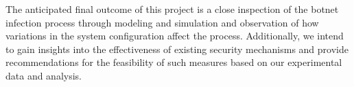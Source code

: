 The anticipated final outcome of this project is a close inspection of the botnet infection process through modeling and simulation and observation of how variations in the system configuration affect the process. Additionally, we intend to gain insights into the effectiveness of existing security mechanisms and provide recommendations for the feasibility of such measures based on our experimental data and analysis.